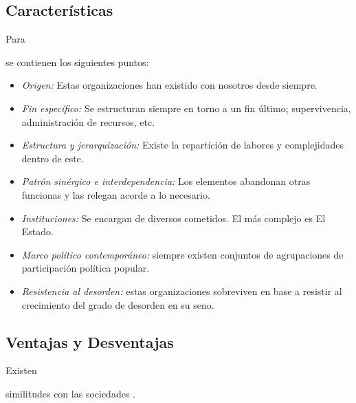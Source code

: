 \documentclass[stu, 12pt, letterpaper, donotrepeattitle, floatsintext, natbib]{apa7}
\begin{document}
\subsection{Características}
Para \begin{justifying}
    \cite{unknown-author-2020B} %
    se contienen los siguientes puntos:
    \begin{itemize}
        \item \emph{Origen:} Estas organizaciones han existido con nosotros desde siempre.
        \item \emph{Fin específico:} Se estructuran siempre en torno a un fin último; supervivencia, administración de recursos, etc.
        \item \emph{Estructura y jerarquización:} Existe la repartición de labores y complejidades dentro de este.
        \item \emph{Patrón sinérgico e interdependencia:} Los elementos abandonan otras funcionas y las relegan acorde a lo necesario.
        \item \emph{Instituciones:} Se encargan de diversos cometidos. El más complejo es El Estado.
        \item \emph{Marco político contemporáneo:} siempre existen conjuntos de agrupaciones de participación política popular.
        \item \emph{Resistencia al desorden:} estas organizaciones sobreviven en base a resistir al crecimiento del grado de desorden en su seno.
    \end{itemize}\par
\end{justifying}
\vspace{\baselineskip}
\subsection{Ventajas y Desventajas}
Existen \begin{justifying}
    similitudes con las sociedades \citep{archit-no-date}. %
\end{justifying}
\end{document}
